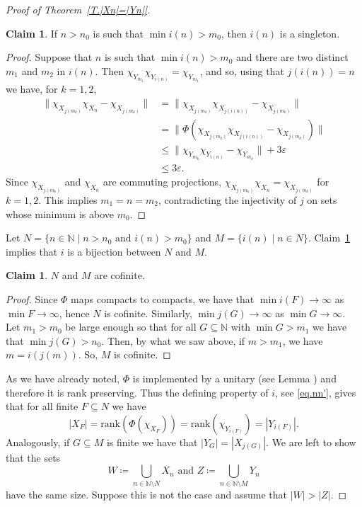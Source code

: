 \documentclass[11pt]{amsart}
\newcommand{\N}{\mathbb{N}}
\newcommand{\eps}{\varepsilon}
\newcommand{\bbN}{\mathbb{N}}
\numberwithin{equation}{section}
\theoremstyle{definition}
\newtheorem{claim}[theorem]{Claim}
\theoremstyle{remark}
\numberwithin{equation}{section}
\begin{document}
\begin{proof}[Proof of Theorem~\ref{T.|Xn|=|Yn|}]
\begin{claim}\label{claim:almostbij}
If $n> n_0$ is such that $\min i(n)>m_0$, then $i(n)$ is a singleton.
\end{claim}
\begin{proof}
Suppose that $n$ is such that $\min i(n)>m_0$ and there are two distinct $m_1$ and $m_2$ in $i(n)$. Then $\chi_{Y_{m_1}}\chi_{Y_{i(n)}}=\chi_{Y_{m_1}}$, and so, using that $j(i(n))=n$ we have, for $k=1,2$,
\begin{align*}
\|\chi_{X_{j(m_k)}}\chi_{X_n}-\chi_{X_{j(m_k)}}\|&= \|\chi_{X_{j(m_k)}}\chi_{X_{j(i(n))}}-\chi_{X_{j(m_k)}}\|\\&=\|\Phi(\chi_{X_{j(m_k)}}\chi_{X_{j(i(n))}}-\chi_{X_{j(m_k)}})\|\\&\leq\|\chi_{Y_{m_k}}\chi_{Y_{i(n)}}-\chi_{Y_{m_k}}\|+3\eps\\
&\leq3\eps.
\end{align*}
Since $\chi_{X_{j(m_k)}}$ and $\chi_{X_n}$ are commuting projections, $\chi_{X_{j(m_k)}}\chi_{X_n}=\chi_{X_{j(m_k)}}$ for $k=1,2$. This implies $m_1=n=m_2$, contradicting the  injectivity of $j$ on sets whose minimum is above $m_0$.
\end{proof}
Let $N=\{n\in\N\mid n>n_0\text{ and } i(n)>m_0\}$ and $M=\{i(n)\mid n\in N\}$. Claim~\ref{claim:almostbij} implies that  $i$ is a bijection between $N$ and $M$.
\begin{claim}
$N$ and $M$ are cofinite.
\end{claim} 

\begin{proof}
Since $\Phi$ maps compacts to compacts, we have that $\min i(F)\to\infty$ as $\min F\to\infty$, hence $N$ is cofinite. Similarly, $\min j(G)\to\infty$ as $\min G\to\infty$. Let $m_1>m_0$ be large enough so that for all $G\subseteq\bbN$ with $\min G>m_1$ we have that $\min j(G)>n_0$. Then, by what we saw above, if $m>m_1$, we have $m=i(j(m))$. So,    $M$ is cofinite.
\end{proof}


As we have already noted, $\Phi$ is implemented by a unitary (see Lemma \cite[Lemma 3.1]{SpakulaWillett2013AdvMath}) and therefore it is  rank preserving. Thus  the defining property of $i$, see \eqref{eq.nn'}, gives that   for all  finite $F\subseteq N$ we have 
\[
|X_F|=\mathrm{rank}(\Phi(\chi_{X_F}))=\mathrm{rank}(\chi_{Y_{i(F)}})=|Y_{i(F)}|.
\] Analogously,  if $G\subseteq M$ is finite  we have that $|Y_G|=|X_{j(G)}|$. We are left to show that the sets 
\[
W\coloneqq \bigcup_{n\in\bbN\setminus N}X_n\text{ and }Z\coloneqq \bigcup_{n\in\bbN\setminus M}Y_n
\]
have the same size. Suppose this is not the case and assume that $|W|>|Z|$.


\end{proof}
\end{document}
